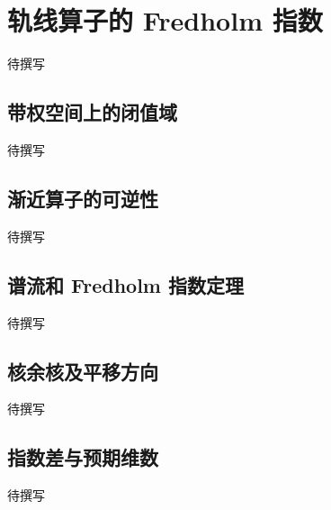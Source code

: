 
% 
% 

\section{轨线算子的 Fredholm 指数}
\label{g4:sec:2504}

待撰写

\subsection{带权空间上的闭值域}
\label{g4:subsec:2504:01}
待撰写

\subsection{渐近算子的可逆性}
\label{g4:subsec:2504:02}
待撰写

\subsection{谱流和 Fredholm 指数定理}
\label{g4:subsec:2504:03}
待撰写

\subsection{核余核及平移方向}
\label{g4:subsec:2504:04}
待撰写

\subsection{指数差与预期维数}
\label{g4:subsec:2504:05}
待撰写
